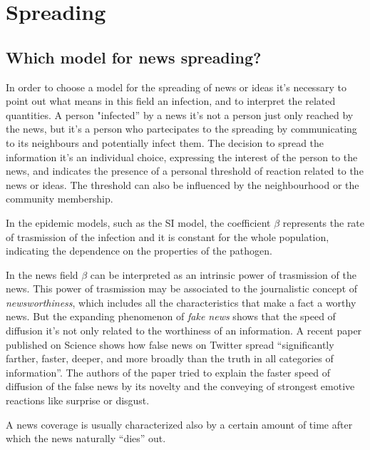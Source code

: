 \chapter{Spreading} %
\label{cha:spreading}

\section{Which model for news spreading?}

In order to choose a model for the spreading of news or ideas it's necessary to point out
what means in this field an infection, and to interpret the related quantities.
A person "infected'' by a news it's not a person just only reached by the news, but it's a person
who partecipates to the spreading by communicating to its neighbours and potentially infect them.
The decision to spread the information it's an individual choice, expressing the interest
of the person to the news, and indicates the presence of a personal threshold of reaction related to the news or ideas.
The threshold can also be influenced by the neighbourhood or the community membership.


In the epidemic models, such as the SI model, the coefficient $\beta$ represents the rate of trasmission of the infection and it is constant for the whole population, indicating the dependence on the properties of the pathogen.

In the news field $\beta$ can be interpreted as an intrinsic power of trasmission of the news.
This power of trasmission may be associated to the journalistic concept of \textit{newsworthiness},
which includes all the characteristics that make a fact a worthy news.
But the expanding phenomenon of \textit{fake news} shows that the speed of diffusion it's not only related to
the worthiness of an information. A recent paper published on Science \cite{Vosoughi_2018} shows how false news on Twitter spread 
``significantly farther, faster, deeper, and more broadly than the truth in all categories of information''.
The authors of the paper tried to explain the faster speed of diffusion of the false news by its novelty and the conveying
of strongest emotive reactions like surprise or disgust.


A news coverage is usually characterized also by a certain amount of time after which the news naturally ``dies'' out.

